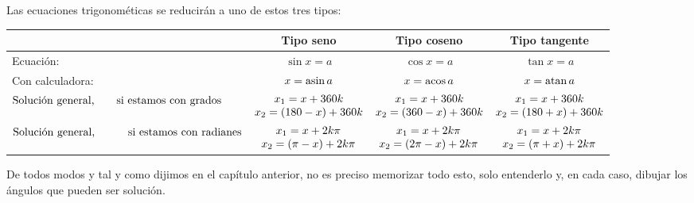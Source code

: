 Las ecuaciones trigonométicas se reducirán a uno de estos tres tipos:

\vspace{3mm}
\begin{table}[H]
\centering
\begin{tabular}{l|c|c|c|}
\cline{2-4}
 &  Tipo seno & Tipo coseno & Tipo tangente  \\ \hline
\multicolumn{1}{|l|}{Ecuación:} & $\sin x=a$ & $\cos x=a$ & $\tan x=a$ \\ \hline
\multicolumn{1}{|l|}{Con calculadora:} & $x=\asin a$ & $x=\acos a$  &  $x=\atan a$ \\ \hline
\multicolumn{1}{|l|}{$\mqty{\text{Solución general, \quad \ \ } \\ \text{si estamos con grados}}$} & $\mqty{ x_1=x+360k \\ x_2=(180-x)+360k }$ & $\mqty{ x_1=x+360k \\ x_2=(360-x)+360k }$ & $\mqty{ x_1=x+360k \\ x_2=(180+x)+360k }$ \\ \hline
\multicolumn{1}{|l|}{$\mqty{\text{Solución general, \quad \quad \ \ } \\ \text{si estamos con radianes}}$} & $\mqty{ x_1=x+2k\pi \\ x_2=(\pi-x)+2k\pi}$ & $\mqty{ x_1=x+2k\pi \\ x_2=(2\pi-x)+2k\pi}$ & $\mqty{ x_1=x+2k\pi \\ x_2=(\pi+x)+2k\pi}$ \\ \hline
\end{tabular}
\end{table}


De todos modos y tal y como dijimos en el capítulo anterior, no es preciso memorizar todo esto, solo entenderlo y, en cada caso, dibujar los ángulos que pueden ser solución.

\vspace{5mm}

